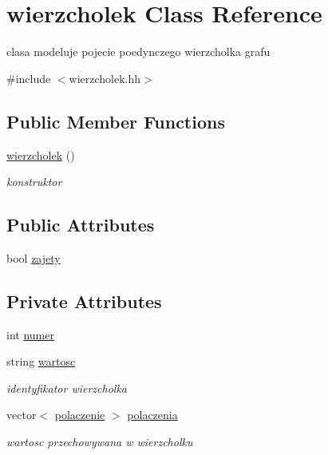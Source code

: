 \hypertarget{classwierzcholek}{\section{wierzcholek \-Class \-Reference}
\label{classwierzcholek}
}


clasa modeluje pojecie poedynczego wierzcholka grafu  




{\ttfamily \#include $<$wierzcholek.\-hh$>$}

\subsection*{\-Public \-Member \-Functions}
\begin{DoxyCompactItemize}
\item 
\hyperlink{classwierzcholek_a0e72695b032e7f750c51041e1a59673b}{wierzcholek} ()
\begin{DoxyCompactList}\small\item\em konstruktor \end{DoxyCompactList}\end{DoxyCompactItemize}
\subsection*{\-Public \-Attributes}
\begin{DoxyCompactItemize}
\item 
bool \hyperlink{classwierzcholek_ad67644b5f408397f28d7150d3bac76d2}{zajety}
\end{DoxyCompactItemize}
\subsection*{\-Private \-Attributes}
\begin{DoxyCompactItemize}
\item 
int \hyperlink{classwierzcholek_a66aaea6b1187250f7100542adc1617d2}{numer}
\item 
string \hyperlink{classwierzcholek_a19aa16bf7e01a987fcc360e5da902209}{wartosc}
\begin{DoxyCompactList}\small\item\em identyfikator wierzcholka \end{DoxyCompactList}\item 
vector$<$ \hyperlink{structpolaczenie}{polaczenie} $>$ \hyperlink{classwierzcholek_ad6442177753c61769b0fa1822e75f551}{polaczenia}
\begin{DoxyCompactList}\small\item\em wartosc przechowywana w wierzcholku \end{DoxyCompactList}\end{DoxyCompactItemize}
